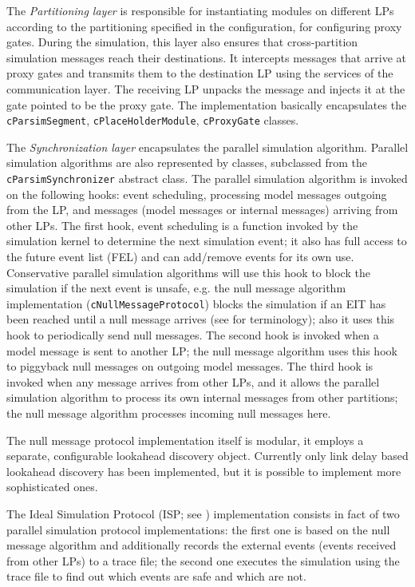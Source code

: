 The \textit{Partitioning layer} is responsible for instantiating
modules on different LPs according to the partitioning specified
in the configuration, for configuring proxy gates.
During the simulation, this layer also ensures that cross-partition
simulation messages reach their destinations. It intercepts messages
that arrive at proxy gates and transmits them to the destination LP
using the services of the communication layer. The receiving LP
unpacks the message and injects it at the gate pointed to be the
proxy gate. The implementation basically encapsulates the
\texttt{cParsimSegment}, \texttt{cPlaceHolderModule},
\texttt{cProxyGate} classes.

The \textit{Synchronization layer} encapsulates the parallel
simulation algorithm. Parallel simulation algorithms are also represented
by classes, subclassed from the \texttt{cParsimSynchronizer} abstract class.
The parallel simulation algorithm is invoked on the following hooks:
event scheduling, processing model messages outgoing from the LP,
and messages (model messages or internal messages) arriving
from other LPs. The first hook, event scheduling is a function
invoked by the simulation kernel to determine the next simulation
event; it also has full access to the future event list (FEL) and
can add/remove events for its own use.
Conservative parallel simulation algorithms will use this hook
to block the simulation if the next event is unsafe, e.g. the
null message algorithm implementation (\texttt{cNullMessageProtocol})
blocks the simulation if an EIT has been reached until a null message
arrives (see \cite{bagrodia00} for terminology); also it uses
this hook to periodically send null messages. The second hook
is invoked when a model message is sent to another LP;
the null message algorithm uses this hook to piggyback null
messages on outgoing model messages. The third hook is invoked
when any message arrives from other LPs, and it allows the
parallel simulation algorithm to process its own internal messages
from other partitions; the null message algorithm processes
incoming null messages here.

The null message protocol implementation itself is modular,
it employs a separate, configurable lookahead discovery object.
Currently only link delay based lookahead discovery has been
implemented, but it is possible to implement more sophisticated
ones.

The Ideal Simulation Protocol (ISP; see \cite{bagrodia00})
implementation consists in fact of two parallel simulation
protocol implementations:
the first one is based on the null message algorithm and
additionally records the external events (events received
from other LPs) to a trace file; the second one executes
the simulation using the trace file to find out which
events are safe and which are not.

